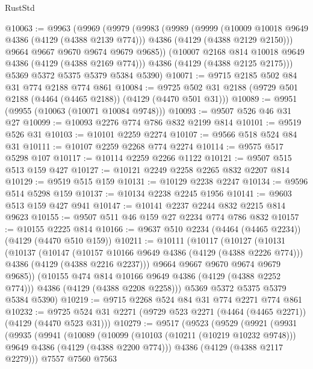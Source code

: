 \begin{lexlean}{RustStd}
\begin{coremodule}
{\begin{coremodule}
{{{{{{{{{{{{{{@10063 := @9963
    (@9969
      (@9979
        (@9983
          (@9989
            (@9999
              (@10009 @10018 @9649 @4386 (@4129 (@4388 @2139 @774)))
              @4386
              (@4129 (@4388 @2129 @2150)))
            @9664
            @9667
            @9670
            @9674
            @9679
            @9685))
        (@10007 @2168 @814 @10018 @9649 @4386 (@4129 (@4388 @2169 @774)))
        @4386
        (@4129 (@4388 @2125 @2175)))
      @5369
      @5372
      @5375
      @5379
      @5384
      @5390)
@10071 := @9715 @2185 @502 @84 @31 @774 @2188 @774 @861
@10084 := @9725 @502 @31 @2188 (@9729 @501 @2188 (@4464 (@4465 @2188)) (@4129 (@4470 @501 @31)))
@10089 := @9951 (@9955 (@10063 (@10071 @10084 @9748)))
@10093 := @9507 @526 @46 @31 @27
@10099 := @10093 @2276 @774 @786 @832 @2199 @814
@10101 := @9519 @526 @31
@10103 := @10101 @2259 @2274
@10107 := @9566 @518 @524 @84 @31
@10111 := @10107 @2259 @2268 @774 @2274
@10114 := @9575 @517 @5298 @107
@10117 := @10114 @2259 @2266 @1122
@10121 := @9507 @515 @513 @159 @427
@10127 := @10121 @2249 @2258 @2265 @832 @2207 @814
@10129 := @9519 @515 @159
@10131 := @10129 @2238 @2247
@10134 := @9596 @514 @5298 @159
@10137 := @10134 @2238 @2245 @1956
@10141 := @9603 @513 @159 @427 @941
@10147 := @10141 @2237 @2244 @832 @2215 @814 @9623
@10155 := @9507 @511 @46 @159 @27 @2234 @774 @786 @832
@10157 := @10155 @2225 @814
@10166 := @9637 @510 @2234 (@4464 (@4465 @2234)) (@4129 (@4470 @510 @159))
@10211 := @10111
    (@10117
      (@10127
        (@10131
          (@10137
            (@10147
              (@10157 @10166 @9649 @4386 (@4129 (@4388 @2226 @774)))
              @4386
              (@4129 (@4388 @2216 @2237)))
            @9664
            @9667
            @9670
            @9674
            @9679
            @9685))
        (@10155 @474 @814 @10166 @9649 @4386 (@4129 (@4388 @2252 @774)))
        @4386
        (@4129 (@4388 @2208 @2258)))
      @5369
      @5372
      @5375
      @5379
      @5384
      @5390)
@10219 := @9715 @2268 @524 @84 @31 @774 @2271 @774 @861
@10232 := @9725 @524 @31 @2271 (@9729 @523 @2271 (@4464 (@4465 @2271)) (@4129 (@4470 @523 @31)))
@10279 := @9517
    (@9523
      (@9529
        (@9921
          (@9931
            (@9935
              (@9941
                (@10089
                  (@10099
                    (@10103 (@10211 (@10219 @10232 @9748)))
                    @9649
                    @4386
                    (@4129 (@4388 @2200 @774)))
                  @4386
                  (@4129 (@4388 @2117 @2279)))
                @7557
                @7560
                @7563
}}}}}}}}}}}}}}
\end{coremodule}}
\end{coremodule}
\end{lexlean}
